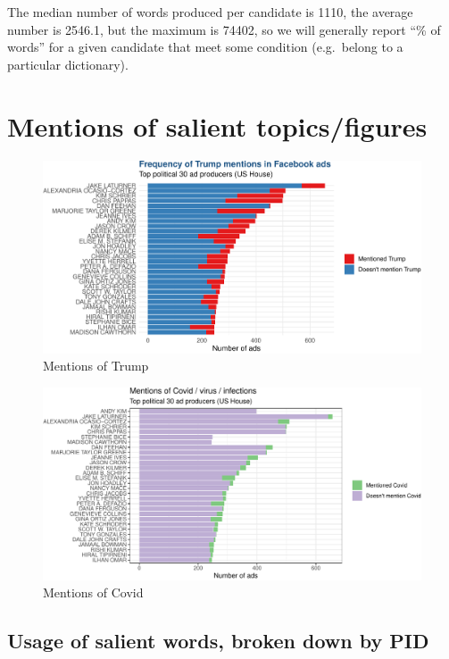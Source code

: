\documentclass[
  12pt,
]{article}
\begin{document}
The median number of words produced per candidate is 1110, the average number is 2546.1, but the maximum is 74402, so we will generally report ``\% of words'' for a given candidate that meet some condition (e.g.~belong to a particular dictionary).

\hypertarget{mentions-of-salient-topicsfigures}{%
\section{Mentions of salient topics/figures}\label{mentions-of-salient-topicsfigures}}

\begin{figure}
\centering
\includegraphics{figsFB/top30-trump-1.pdf}
\caption{\label{fig:top30-trump}Mentions of Trump}
\end{figure}

\begin{figure}
\centering
\includegraphics{figsFB/top30-covid-1.pdf}
\caption{\label{fig:top30-covid}Mentions of Covid}
\end{figure}

\pagebreak

\hypertarget{usage-of-salient-words-broken-down-by-pid}{%
\subsection{Usage of salient words, broken down by PID}\label{usage-of-salient-words-broken-down-by-pid}}
\end{document}
